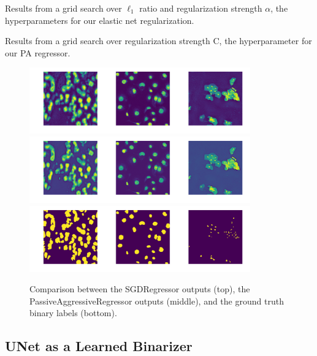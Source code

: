 \documentclass[paper=letter, fontsize=12pt]{article}
\numberwithin{equation}{section} %
\numberwithin{figure}{section} %
\numberwithin{table}{section} %
\begin{document}
\begin{table}[H]
    \centering
    \caption{Results from a grid search over $\ell_1$ ratio and regularization
    strength $\alpha$, the hyperparameters for our elastic net regularization.}
    \label{tab:sgd-gs}
    
\end{table}

\begin{table}[H]
    \centering
    \caption{Results from a grid search over regularization strength C, the
    hyperparameter for our PA regressor.}
    \label{tab:pa-gs}
    
\end{table}

\begin{figure}[H]
    \centering
    \includegraphics[width=0.85\textwidth]{./figs/sgd-output.png}
    \includegraphics[width=0.85\textwidth]{./figs/pa-output.png}
    \includegraphics[width=0.85\textwidth]{./figs/ground-truth-binary.png}
    \caption{Comparison between the SGDRegressor outputs (top), the
    PassiveAggressiveRegressor outputs (middle), and the ground truth binary
    labels (bottom).}
    \label{fig:processing-results}
\end{figure}

\subsection{UNet as a Learned Binarizer}
\end{document}
